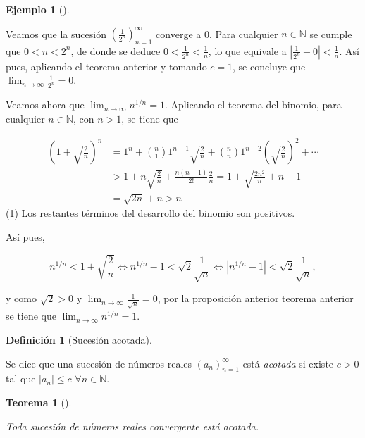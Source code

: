 \documentclass[
  a4paper,
]{scrreport}
\theoremstyle{plain}
\theoremstyle{plain}
\newtheorem{theorem}{Teorema}[chapter]
\theoremstyle{definition}
\newtheorem{definition}{Definición}[chapter]
\theoremstyle{definition}
\newtheorem{example}{Ejemplo}[chapter]
\theoremstyle{plain}
\theoremstyle{definition}
\theoremstyle{remark}
\begin{document}
\begin{example}[]\protect\hypertarget{exm-convergencia-sucesion-acotada}{}\label{exm-convergencia-sucesion-acotada}

Veamos que la sucesión \(\left(\frac{1}{2^n}\right)_{n=1}^\infty\)
converge a 0. Para cualquier \(n\in\mathbb{N}\) se cumple que
\(0<n<2^n\), de donde se deduce \(0<\frac{1}{2^n}<\frac{1}{n}\), lo que
equivale a \(|\frac{1}{2^n}-0|<\frac{1}{n}\). Así pues, aplicando el
teorema anterior y tomando \(c=1\), se concluye que
\(\lim_{n\to\infty}\frac{1}{2^n}=0\).

Veamos ahora que \(\lim_{n\to\infty}n^{1/n}=1\). Aplicando el teorema
del binomio, para cualquier \(n\in\mathbb{N}\), con \(n>1\), se tiene
que

\begin{align*}
(1+\sqrt{\frac{2}{n}})^n 
&= 1^n + \binom{n}{1}1^{n-1}\sqrt{\frac{2}{n}} + \binom{n}{n}1^{n-2}\left(\sqrt{\frac{2}{n}}\right)^2 + \cdots \tag{1} \\
& > 1 + n\sqrt{\frac{2}{n}} + \frac{n(n-1)}{2!}\frac{2}{n}
= 1 + \sqrt{\frac{2n^2}{n}} + n -1 \\
&= \sqrt{2n} + n
> n 
\end{align*} (1) Los restantes términos del desarrollo del binomio son
positivos.

Así pues,

\[
n^{1/n} < 1+\sqrt{\frac{2}{n}} 
\Leftrightarrow n^{1/n} - 1 < \sqrt{2}{\frac{1}{\sqrt{n}}} 
\Leftrightarrow |n^{1/n} - 1| < \sqrt{2}\frac{1}{\sqrt{n}},
\]

y como \(\sqrt{2}>0\) y \(\lim_{n\to\infty}\frac{1}{\sqrt{n}}=0\), por
la proposición anterior teorema anterior se tiene que
\(\lim_{n\to\infty} n^{1/n} = 1\).

\end{example}

\begin{definition}[Sucesión
acotada]\protect\hypertarget{def-sucesion-acotada}{}\label{def-sucesion-acotada}

Se dice que una sucesión de números reales \((a_n)_{n=1}^\infty\) está
\emph{acotada} si existe \(c>0\) tal que \(|a_n|\leq c\)
\(\forall n\in\mathbb{N}\).

\end{definition}

\begin{theorem}[]\protect\hypertarget{thm-convergencia-sucesion-acotada}{}\label{thm-convergencia-sucesion-acotada}

Toda sucesión de números reales convergente está acotada.

\end{theorem}
\end{document}
